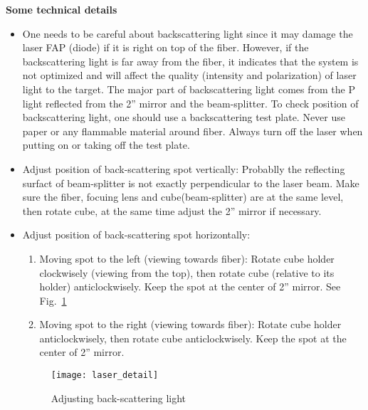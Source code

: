 {\medskip
\noindent
{\bf{Some technical details}}
\begin{itemize}
\item One needs to be careful about backscattering light since it may
damage the laser FAP (diode) if it is right on top of the fiber.
However, if the backscattering light is far away from the fiber, it
indicates that the system is not optimized and will affect the quality
(intensity and polarization) of laser light to the target.  The major
part of backscattering light comes from the P light reflected from the
2'' mirror and the beam-splitter. To check position of backscattering 
light, one should use a backscattering
test plate.  Never use paper or any flammable material around fiber.
Always turn off the laser when putting on or taking off the test plate.

\item Adjust position of back-scattering spot vertically: 
Probablly the reflecting surfact of beam-splitter is not exactly
perpendicular to the laser beam.  Make sure the fiber, focuing lens
and cube(beam-splitter) are at the same level, then rotate cube, at
the same time adjust the 2'' mirror if necessary.

\item Adjust position of back-scattering spot horizontally:
\begin{enumerate}
\item Moving spot to the left (viewing towards fiber): Rotate cube
holder clockwisely (viewing from the top), then rotate cube (relative
to its holder) anticlockwisely.  Keep the spot at the center of 2''
mirror.  See Fig.~\ref{fig:laser_detail}

\item Moving spot to the right (viewing towards fiber): Rotate cube
holder anticlockwisely, then rotate cube anticlockwisely.  Keep the 
spot at the center of 2'' mirror.
\end{enumerate}

\begin{figure}
\begin{center}
\centerline{\texttt{[image: laser\_detail]}}
\end{center}
\caption{Adjusting back-scattering light}
\label{fig:laser_detail}
\end{figure}

\end{itemize}


}

